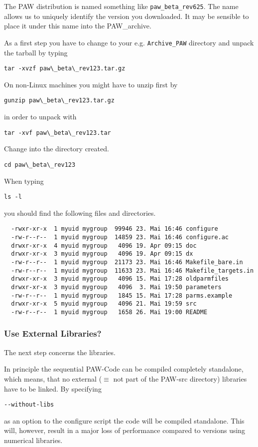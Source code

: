 \documentclass[a4paper,10pt]{article}
\newcommand{\PAW}{\textsc{PAW}}
\begin{document}
The PAW distribution is named something like \texttt{paw\_beta\_rev625}.
The name allows us to uniquely identify the version you downloaded. It
may be sensible to place it under this name into the PAW\_archive.

As a first step you have to change to your e.g. \texttt{Archive\_PAW} directory
and unpack the tarball by typing
\begin{verbatim}
tar -xvzf paw\_beta\_rev123.tar.gz
\end{verbatim}
On non-Linux machines you might have to unzip first by
\begin{verbatim}
gunzip paw\_beta\_rev123.tar.gz
\end{verbatim}
in order to unpack with
\begin{verbatim}
tar -xvf paw\_beta\_rev123.tar
\end{verbatim}
Change into the directory created.
\begin{verbatim}
cd paw\_beta\_rev123
\end{verbatim}
When typing
\begin{verbatim}
ls -l
\end{verbatim}
you should find the following files and directories.
\begin{verbatim}
  -rwxr-xr-x  1 myuid mygroup  99946 23. Mai 16:46 configure
  -rw-r--r--  1 myuid mygroup  14859 23. Mai 16:46 configure.ac
  drwxr-xr-x  4 myuid mygroup   4096 19. Apr 09:15 doc
  drwxr-xr-x  3 myuid mygroup   4096 19. Apr 09:15 dx
  -rw-r--r--  1 myuid mygroup  21173 23. Mai 16:46 Makefile_bare.in
  -rw-r--r--  1 myuid mygroup  11633 23. Mai 16:46 Makefile_targets.in
  drwxr-xr-x  3 myuid mygroup   4096 15. Mai 17:28 oldparmfiles
  drwxr-xr-x  3 myuid mygroup   4096  3. Mai 19:50 parameters
  -rw-r--r--  1 myuid mygroup   1845 15. Mai 17:28 parms.example
  drwxr-xr-x  5 myuid mygroup   4096 21. Mai 19:59 src
  -rw-r--r--  1 myuid mygroup   1658 26. Mai 19:00 README
\end{verbatim}



\subsubsection*{Use External Libraries?}
\label{sub:libs}
The next step concerns the libraries.  



In principle the sequential \PAW-Code
can be compiled completely standalone, which means, that no external ($\equiv$
not part of the \PAW-src directory) libraries have to be linked.  By specifying
\begin{verbatim}
--without-libs
\end{verbatim}
as an option to the configure script the code will be compiled standalone.
This will, however, result in a major loss of performance compared to versions
using numerical libraries.
\end{document}
